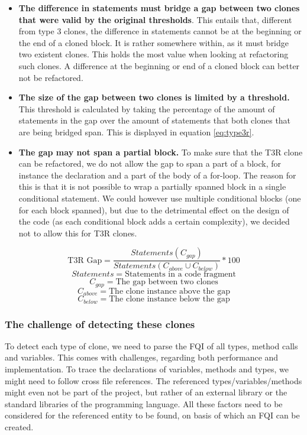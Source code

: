 \documentclass[a4paper]{article}
\begin{document}
\begin{itemize}
  \item \textbf{The difference in statements must bridge a gap between two clones that were valid by the original thresholds}. This entails that, different from type 3 clones, the difference in statements cannot be at the beginning or the end of a cloned block. It is rather somewhere within, as it must bridge two existent clones. This holds the most value when looking at refactoring such clones. A difference at the beginning or end of a cloned block can better not be refactored.
  \item \textbf{The size of the gap between two clones is limited by a threshold.} This threshold is calculated by taking the percentage of the amount of statements in the gap over the amount of statements that both clones that are being bridged span. This is displayed in equation \ref{eq:type3r}.
  \item \textbf{The gap may not span a partial block.} To make sure that the T3R clone can be refactored, we do not allow the gap to span a part of a block, for instance the declaration and a part of the body of a for-loop. The reason for this is that it is not possible to wrap a partially spanned block in a single conditional statement. We could however use multiple conditional blocks (one for each block spanned), but due to the detrimental effect on the design of the code (as each conditional block adds a certain complexity), we decided not to allow this for T3R clones.
\end{itemize}

\begin{equation}\label{eq:type3r}
\text{T3R Gap}=\frac{Statements(C_{gap})}{Statements(C_{above} \cup C_{below})}*100
\end{equation}
$$Statements = \text{Statements in a code fragment}$$
$$C_{gap} = \text{The gap between two clones}$$
$$C_{above} = \text{The clone instance above the gap}$$
$$C_{below} = \text{The clone instance below the gap}$$

\subsubsection{The challenge of detecting these clones}\label{chap:challenge}
To detect each type of clone, we need to parse the FQI of all types, method calls and variables. This comes with challenges, regarding both performance and implementation. To trace the declarations of variables, methods and types, we might need to follow cross file references. The referenced types/variables/methods might even not be part of the project, but rather of an external library or the standard libraries of the programming language. All these factors need to be considered for the referenced entity to be found, on basis of which an FQI can be created.
\end{document}

